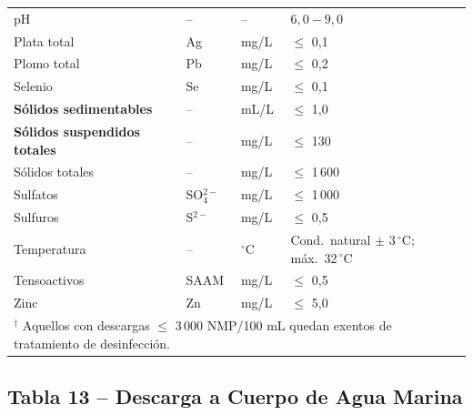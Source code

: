 \documentclass[12pt,a4paper]{article}
\begin{document}
\begin{longtable}{p{4.5cm}p{2.0cm}p{2.0cm}p{3.5cm}}
pH & -- & -- & $6,0 - 9,0$ \\
Plata total & Ag & mg/L & $\leq$ 0,1 \\
Plomo total & Pb & mg/L & $\leq$ 0,2 \\
Selenio & Se & mg/L & $\leq$ 0,1 \\
\textbf{S\'olidos sedimentables} & -- & mL/L & $\leq$ 1,0 \\
\textbf{S\'olidos suspendidos totales} & -- & mg/L & $\leq$ 130 \\
S\'olidos totales & -- & mg/L & $\leq$ 1\,600 \\
Sulfatos & SO$_4^{2-}$ & mg/L & $\leq$ 1\,000 \\
Sulfuros & S$^{2-}$ & mg/L & $\leq$ 0,5 \\
Temperatura & -- & $^\circ$C & Cond.\ natural $\pm$ 3\,$^\circ$C; m\'ax.\ 32\,$^\circ$C \\
Tensoactivos & SAAM & mg/L & $\leq$ 0,5 \\
Zinc & Zn & mg/L & $\leq$ 5,0 \\
\multicolumn{4}{l}{\scriptsize $^\dagger$ Aquellos con descargas $\leq$ 3\,000 NMP/100 mL quedan exentos de tratamiento de desinfecci\'on.}\\
\end{longtable}
\normalsize

\subsection{Tabla 13 -- Descarga a Cuerpo de Agua Marina}
\tiny
\end{document}
